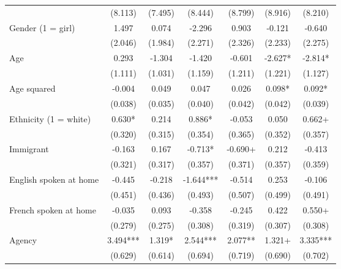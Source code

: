 \documentclass[
  letterpaper,
  DIV=11,
  numbers=noendperiod]{scrreprt}
\begin{document}
\begin{table}
\begin{tabular}[t]{lcccccc}
\hspace{1em} & (8.113) & (7.495) & (8.444) & (8.799) & (8.916) & (8.210)\\
\hspace{1em}Gender (1 = girl) & 1.497 & 0.074 & -2.296 & 0.903 & -0.121 & -0.640\\
\hspace{1em} & (2.046) & (1.984) & (2.271) & (2.326) & (2.233) & (2.275)\\
\hspace{1em}Age & 0.293 & -1.304 & -1.420 & -0.601 & -2.627* & -2.814*\\
\hspace{1em} & (1.111) & (1.031) & (1.159) & (1.211) & (1.221) & (1.127)\\
\hspace{1em}Age squared & -0.004 & 0.049 & 0.047 & 0.026 & 0.098* & 0.092*\\
\hspace{1em} & (0.038) & (0.035) & (0.040) & (0.042) & (0.042) & (0.039)\\
\hspace{1em}Ethnicity (1 = white) & 0.630* & 0.214 & 0.886* & -0.053 & 0.050 & 0.662+\\
\hspace{1em} & (0.320) & (0.315) & (0.354) & (0.365) & (0.352) & (0.357)\\
\hspace{1em}Immigrant & -0.163 & 0.167 & -0.713* & -0.690+ & 0.212 & -0.413\\
\hspace{1em} & (0.321) & (0.317) & (0.357) & (0.371) & (0.357) & (0.359)\\
\hspace{1em}English spoken at home & -0.445 & -0.218 & -1.644*** & -0.514 & 0.253 & -0.106\\
\hspace{1em} & (0.451) & (0.436) & (0.493) & (0.507) & (0.499) & (0.491)\\
\hspace{1em}French spoken at home & -0.035 & 0.093 & -0.358 & -0.245 & 0.422 & 0.550+\\
\hspace{1em} & (0.279) & (0.275) & (0.308) & (0.319) & (0.307) & (0.308)\\
\hspace{1em}Agency & 3.494*** & 1.319* & 2.544*** & 2.077** & 1.321+ & 3.335***\\
\hspace{1em} & (0.629) & (0.614) & (0.694) & (0.719) & (0.690) & (0.702)\\

\end{tabular}
\end{table}
\end{document}
